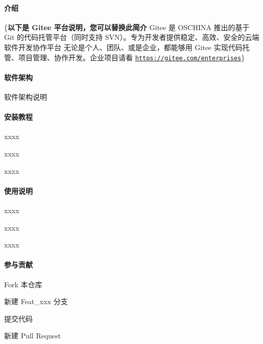\paragraph*{介绍}

\{{\bfseries 以下是 Gitee 平台说明，您可以替换此简介} Gitee 是 O\+S\+C\+H\+I\+NA 推出的基于 Git 的代码托管平台（同时支持 S\+V\+N）。专为开发者提供稳定、高效、安全的云端软件开发协作平台 无论是个人、团队、或是企业，都能够用 Gitee 实现代码托管、项目管理、协作开发。企业项目请看 \href{https://gitee.com/enterprises}{\tt https\+://gitee.\+com/enterprises}\}

\paragraph*{软件架构}

软件架构说明

\paragraph*{安装教程}


\begin{DoxyEnumerate}
\item xxxx
\item xxxx
\item xxxx
\end{DoxyEnumerate}

\paragraph*{使用说明}


\begin{DoxyEnumerate}
\item xxxx
\item xxxx
\item xxxx
\end{DoxyEnumerate}

\paragraph*{参与贡献}


\begin{DoxyEnumerate}
\item Fork 本仓库
\item 新建 Feat\+\_\+xxx 分支
\item 提交代码
\item 新建 Pull Request
\end{DoxyEnumerate}

